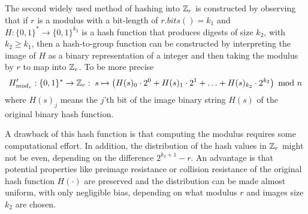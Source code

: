 The second widely used method of hashing into $\mathbb{Z}_r$ is constructed by observing that if $r$ is a modulus with a bit-length of $r.bits()=k_1$ and $H:\{0,1\}^*\to \{0,1\}^{k_2}$ is a hash function that produces digests of size $k_2$, with $k_2\geq k_1$, then a hash-to-group function can be constructed by interpreting the image of $H$ as a binary representation of a integer and then taking the modulus by $r$ to map into $\mathbb{Z}_r$. To be more precise 
\begin{equation}
H'_{mod_r}: \{0,1\}^* \to \mathbb{Z}_r: \; s \mapsto 
\left(H(s)_0\cdot 2^0 + H(s)_1\cdot 2^1 + \ldots + H(s)_{k_2}\cdot 2^{k_2}\right) \text{ mod } n
\end{equation}
where $H(s)_j$ means the $j$'th bit of the image binary string $H(s)$ of the original binary hash function. 

A drawback of this hash function is that computing the modulus requires some computational effort. In addition, the distribution of the hash values in $\mathbb{Z}_r$ might not be even, depending on the difference $2^{k_2+1}-r$. An advantage is that potential properties like preimage resistance or collision resistance of the original hash function $H(\cdot)$ are preserved and the distribution can be made almost uniform, with only negligible bias, depending on what modulus $r$ and images size $k_2$ are  chosen.
